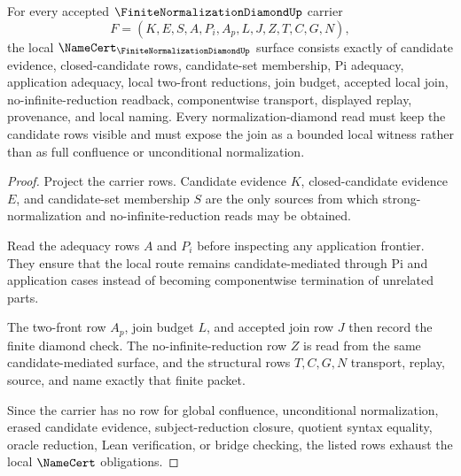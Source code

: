 \begin{theorem}
\label{thm:finite-normalization-diamond-namecert-obligations}
For every accepted $\FiniteNormalizationDiamondUp$ carrier
$$
F=(K,E,S,A,P_i,A_p,L,J,Z,T,C,G,N),
$$
the local $\NameCert_{\FiniteNormalizationDiamondUp}$ surface consists exactly of candidate evidence, closed-candidate rows, candidate-set membership, Pi adequacy, application adequacy, local two-front reductions, join budget, accepted local join, no-infinite-reduction readback, componentwise transport, displayed replay, provenance, and local naming. Every normalization-diamond read must keep the candidate rows visible and must expose the join as a bounded local witness rather than as full confluence or unconditional normalization.
\end{theorem}
\begin{proof}
Project the carrier rows. Candidate evidence $K$, closed-candidate evidence $E$, and candidate-set membership $S$ are the only sources from which strong-normalization and no-infinite-reduction reads may be obtained.

Read the adequacy rows $A$ and $P_i$ before inspecting any application frontier. They ensure that the local route remains candidate-mediated through Pi and application cases instead of becoming componentwise termination of unrelated parts.

The two-front row $A_p$, join budget $L$, and accepted join row $J$ then record the finite diamond check. The no-infinite-reduction row $Z$ is read from the same candidate-mediated surface, and the structural rows $T,C,G,N$ transport, replay, source, and name exactly that finite packet.

Since the carrier has no row for global confluence, unconditional normalization, erased candidate evidence, subject-reduction closure, quotient syntax equality, oracle reduction, Lean verification, or bridge checking, the listed rows exhaust the local $\NameCert$ obligations.
\end{proof}


